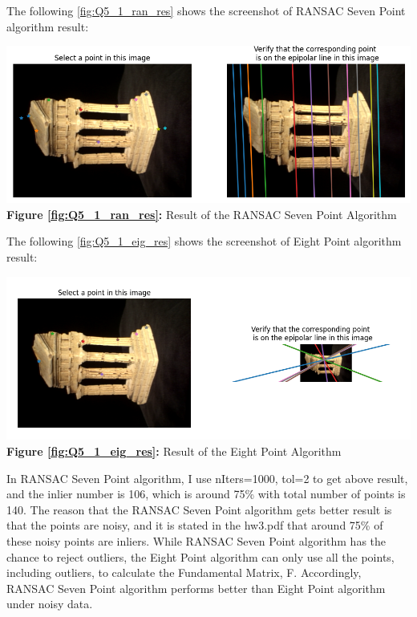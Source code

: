\begin{your_solution}[title=Q5.1,height=20.5cm,width=\linewidth]
The following \autoref{fig:Q5_1_ran_res} shows the screenshot of RANSAC Seven Point algorithm result:
\newline

\begin{minipage}{1\linewidth}
	\centering
	\includegraphics[width=1\linewidth, height=0.39\columnwidth]{../Q5_1_ransac_seven_result.png}
	\textbf{Figure \ref{fig:Q5_1_ran_res}:} Result of the RANSAC Seven Point Algorithm  %
	\label{fig:Q5_1_ran_res}         %
\end{minipage}
\newline

The following \autoref{fig:Q5_1_eig_res} shows the screenshot of Eight Point algorithm result:
\newline

\begin{minipage}{1\linewidth}
	\centering
	\includegraphics[width=1\linewidth, height=0.39\columnwidth]{../Q5_1_eight_result.png}
	\textbf{Figure \ref{fig:Q5_1_eig_res}:} Result of the Eight Point Algorithm  %
	\label{fig:Q5_1_eig_res}         %
\end{minipage}
\newline

In RANSAC Seven Point algorithm, I use nIters=1000, tol=2 to get above result, and the inlier number is 106, which is around 75\% with total number of points is 140. The reason that the RANSAC Seven Point algorithm gets better result is that the points are noisy, and it is stated in the hw3.pdf that around 75\% of these noisy points are inliers. While RANSAC Seven Point algorithm has the chance to reject outliers, the Eight Point algorithm can only use all the points, including outliers, to calculate the Fundamental Matrix, F. Accordingly, RANSAC Seven Point algorithm performs better than Eight Point algorithm under noisy data.

\end{your_solution}

